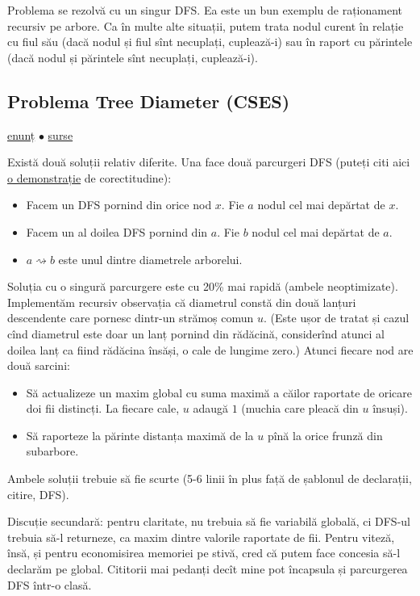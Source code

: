 \documentclass[../main.tex]{subfiles}
\begin{document}
Problema se rezolvă cu un singur DFS. Ea este un bun exemplu de raționament recursiv pe arbore. Ca în multe alte situații, putem trata nodul curent în relație cu fiul său (dacă nodul și fiul sînt necuplați, cuplează-i) sau în raport cu părintele (dacă nodul și părintele sînt necuplați, cuplează-i).

\subsection{Problema Tree Diameter (CSES)}
\label{problem:tree-diameter}

\href{https://cses.fi/problemset/task/1131}{enunț}
$\bullet$
\hyperref[code:tree-diameter]{surse}

Există două soluții relativ diferite. Una face două parcurgeri DFS (puteți citi aici \href{https://stackoverflow.com/a/20014438/6022817}{o demonstrație} de corectitudine):

\begin{itemize}
  \item Facem un DFS pornind din orice nod $x$. Fie $a$ nodul cel mai depărtat de $x$.
  \item Facem un al doilea DFS pornind din $a$. Fie $b$ nodul cel mai depărtat de $a$.
  \item $a \rightsquigarrow b$ este unul dintre diametrele arborelui.
\end{itemize}

Soluția cu o singură parcurgere este cu 20\% mai rapidă (ambele neoptimizate). Implementăm recursiv observația că diametrul constă din două lanțuri descendente care pornesc dintr-un strămoș comun $u$. (Este ușor de tratat și cazul cînd diametrul este doar un lanț pornind din rădăcină, considerînd atunci al doilea lanț ca fiind rădăcina însăși, o cale de lungime zero.) Atunci fiecare nod are două sarcini:

\begin{itemize}
  \item Să actualizeze un maxim global cu suma maximă a căilor raportate de oricare doi fii distincți. La fiecare cale, $u$ adaugă $1$ (muchia care pleacă din $u$ însuși).
  \item Să raporteze la părinte distanța maximă de la $u$ pînă la orice frunză din subarbore.
\end{itemize}

Ambele soluții trebuie să fie scurte (5-6 linii în plus față de șablonul de declarații, citire, DFS).

Discuție secundară: pentru claritate,  nu trebuia să fie variabilă globală, ci DFS-ul trebuia să-l returneze, ca maxim dintre valorile raportate de fii. Pentru viteză, însă, și pentru economisirea memoriei pe stivă, cred că putem face concesia să-l declarăm pe  global. Cititorii mai pedanți decît mine  pot încapsula  și parcurgerea DFS într-o clasă.
\end{document}

